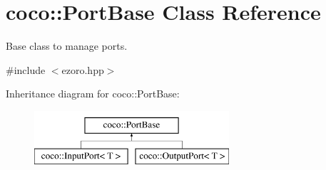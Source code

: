 \hypertarget{classcoco_1_1_port_base}{\section{coco\-:\-:Port\-Base Class Reference}
\label{classcoco_1_1_port_base}
}


Base class to manage ports.  




{\ttfamily \#include $<$ezoro.\-hpp$>$}

Inheritance diagram for coco\-:\-:Port\-Base\-:\begin{figure}[H]
\begin{center}
\leavevmode
\includegraphics[height=2.000000cm]{classcoco_1_1_port_base}
\end{center}
\end{figure}
